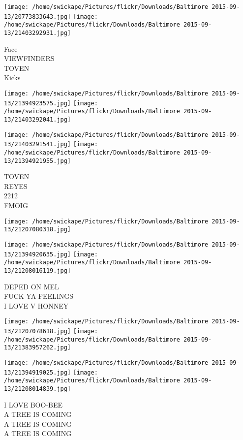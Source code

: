 \documentclass[10pt,letterpaper]{article}
\begin{document}
\texttt{[image: /home/swickape/Pictures/flickr/Downloads/Baltimore 2015-09-13/20773833643.jpg]}
\texttt{[image: /home/swickape/Pictures/flickr/Downloads/Baltimore 2015-09-13/21403292931.jpg]}

Face\\
VIEWFINDERS\\
TOVEN\\
Kicks\\
\pagebreak

\texttt{[image: /home/swickape/Pictures/flickr/Downloads/Baltimore 2015-09-13/21394923575.jpg]}
\texttt{[image: /home/swickape/Pictures/flickr/Downloads/Baltimore 2015-09-13/21403292041.jpg]}

\texttt{[image: /home/swickape/Pictures/flickr/Downloads/Baltimore 2015-09-13/21403291541.jpg]}
\texttt{[image: /home/swickape/Pictures/flickr/Downloads/Baltimore 2015-09-13/21394921955.jpg]}

TOVEN\\
REYES\\
2212\\
FMOIG\\
\pagebreak

\texttt{[image: /home/swickape/Pictures/flickr/Downloads/Baltimore 2015-09-13/21207080318.jpg]}

\vspace{0.25in}
\texttt{[image: /home/swickape/Pictures/flickr/Downloads/Baltimore 2015-09-13/21394920635.jpg]}
\texttt{[image: /home/swickape/Pictures/flickr/Downloads/Baltimore 2015-09-13/21208016119.jpg]}

DEPED ON MEL\\
FUCK YA FEELINGS\\
I LOVE V HONNEY\\
\pagebreak

\texttt{[image: /home/swickape/Pictures/flickr/Downloads/Baltimore 2015-09-13/21207078618.jpg]}
\texttt{[image: /home/swickape/Pictures/flickr/Downloads/Baltimore 2015-09-13/21383957262.jpg]}

\texttt{[image: /home/swickape/Pictures/flickr/Downloads/Baltimore 2015-09-13/21394919025.jpg]}
\texttt{[image: /home/swickape/Pictures/flickr/Downloads/Baltimore 2015-09-13/21208014839.jpg]}

I LOVE BOO{-}BEE\\
A TREE IS COMING\\
A TREE IS COMING\\
A TREE IS COMING\\
\pagebreak
\end{document}
